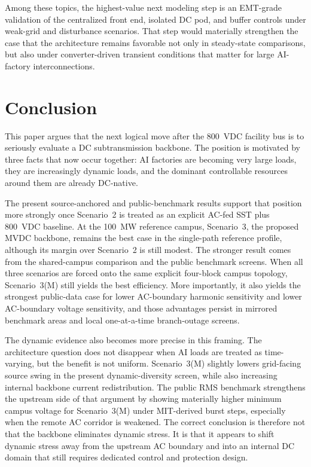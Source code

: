 \documentclass[11pt]{article}
\begin{document}
Among these topics, the highest-value next modeling step is an EMT-grade validation of the centralized front end, isolated DC pod, and buffer controls under weak-grid and disturbance scenarios. That step would materially strengthen the case that the architecture remains favorable not only in steady-state comparisons, but also under converter-driven transient conditions that matter for large AI-factory interconnections.

\section{Conclusion}
This paper argues that the next logical move after the 800~VDC facility bus is to seriously evaluate a DC subtransmission backbone. The position is motivated by three facts that now occur together: AI factories are becoming very large loads, they are increasingly dynamic loads, and the dominant controllable resources around them are already DC-native.

The present source-anchored and public-benchmark results support that position more strongly once Scenario~2 is treated as an explicit AC-fed SST plus 800~VDC baseline. At the 100~MW reference campus, Scenario~3, the proposed MVDC backbone, remains the best case in the single-path reference profile, although its margin over Scenario~2 is still modest. The stronger result comes from the shared-campus comparison and the public benchmark screens. When all three scenarios are forced onto the same explicit four-block campus topology, Scenario~3(M) still yields the best efficiency. More importantly, it also yields the strongest public-data case for lower AC-boundary harmonic sensitivity and lower AC-boundary voltage sensitivity, and those advantages persist in mirrored benchmark areas and local one-at-a-time branch-outage screens.

The dynamic evidence also becomes more precise in this framing. The architecture question does not disappear when AI loads are treated as time-varying, but the benefit is not uniform. Scenario~3(M) slightly lowers grid-facing source swing in the present dynamic-diversity screen, while also increasing internal backbone current redistribution. The public RMS benchmark strengthens the upstream side of that argument by showing materially higher minimum campus voltage for Scenario~3(M) under MIT-derived burst steps, especially when the remote AC corridor is weakened. The correct conclusion is therefore not that the backbone eliminates dynamic stress. It is that it appears to shift dynamic stress away from the upstream AC boundary and into an internal DC domain that still requires dedicated control and protection design.
\end{document}
